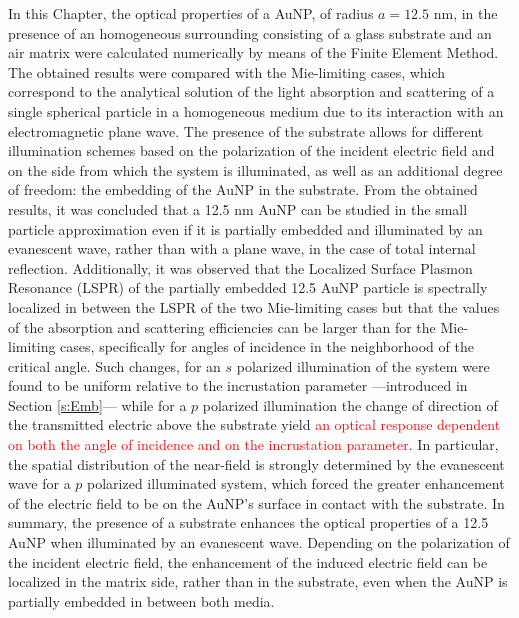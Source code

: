 In this Chapter, the optical properties of a AuNP, of radius $a=12.5$ nm, in the presence of an homogeneous surrounding consisting of a glass substrate and an air matrix were calculated numerically by means of the Finite Element Method. The obtained results were compared with the Mie-limiting cases, which correspond to the analytical solution of the light absorption and scattering of a single spherical particle in a homogeneous medium due to its interaction with an electromagnetic plane wave.  The presence of the substrate allows for different illumination schemes based on the polarization of the incident electric field and on the side from which the system is illuminated, as well as an additional degree of freedom: the embedding of the AuNP in the substrate. From the obtained results, it was concluded that a 12.5 nm AuNP can be studied in the small particle approximation even if it is partially embedded and illuminated by an evanescent wave, rather than with a plane wave, in the case of total internal reflection. Additionally, it was observed that the Localized Surface Plasmon Resonance (LSPR) of the partially embedded 12.5 AuNP particle is spectrally localized in between the LSPR of the two Mie-limiting cases but that the values of the absorption and scattering efficiencies can be larger than for the Mie-limiting cases, specifically for angles of incidence in the neighborhood of the critical angle. Such changes, for an $s$ polarized illumination of the system were found to be uniform relative to the incrustation parameter ---introduced in Section \ref{s:Emb}--- while for a $p$ polarized illumination the change of  direction of the transmitted electric above the substrate yield \textcolor{red}{an optical response dependent on both the angle of incidence and on the incrustation parameter}. In particular, the spatial distribution of the near-field is strongly determined by the evanescent wave for a $p$ polarized illuminated system, which forced the greater enhancement of the electric field to be on the AuNP's surface in contact with the substrate. In summary, the presence of a substrate enhances the optical properties of a 12.5 AuNP when illuminated by an evanescent wave. Depending on the polarization of the incident electric field, the enhancement of the induced electric field can be localized in the matrix side, rather than in the substrate, even when the AuNP is partially embedded in between both media.

